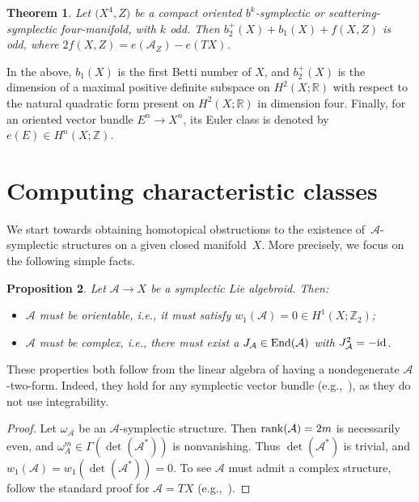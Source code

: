 \documentclass[10pt,a4paper]{amsart}
\numberwithin{equation}{section}
\newtheorem{Theorem}{Theorem}[section]
\newtheorem{Proposition}[Theorem]{Proposition}
 { \theoremstyle{definition}
\newtheorem{Definition}[Theorem]{Definition}
\newtheorem{Example}[Theorem]{Example}
\newtheorem{Remark}[Theorem]{Remark} }
\begin{document}
\begin{Theorem}\label{thm:intrologsymp} Let $\big(X^4,Z\big)$ be a compact oriented $b^k$-symplectic or scattering-symplectic four-manifold, with $k$ odd. Then $b_2^+(X) + b_1(X) + f(X,Z)$ is odd, where $2 f(X,Z) = e(\mathcal{A}_Z) - e(TX)$.
\end{Theorem}

In the above, $b_1(X)$ is the first Betti number of $X$, and $b_2^+(X)$ is the dimension of a maximal positive definite subspace on $H^2(X;\mathbb{R})$ with respect to the natural quadratic form present on $H^2(X;\mathbb{R})$ in dimension four. Finally, for an oriented vector bundle $E^n \to X^n$, its Euler class is denoted by $e(E) \in H^n(X;\mathbb{Z})$.

\section{Computing characteristic classes}\label{sec:homotopical}

We start towards obtaining homotopical obstructions to the existence of~$\mathcal{A}$-symplectic structures on a given closed manifold~$X$. More precisely, we focus on the following simple facts.

\begin{Proposition}\label{prop:symplaconsequences} Let $\mathcal{A} \to X$ be a symplectic Lie algebroid. Then:
	\begin{itemize}\itemsep=0pt
	\item $\mathcal{A}$ must be orientable, i.e., it must satisfy $w_1(\mathcal{A}) = 0 \in H^1(X;\mathbb{Z}_2)$;
	\item $\mathcal{A}$ must be complex, i.e., there must exist a $J_\mathcal{A} \in {\rm End}(\mathcal{A})$ with $J_\mathcal{A}^2 = - {\rm id}$.
	\end{itemize}
\end{Proposition}

These properties both follow from the linear algebra of having a nondegenerate $\mathcal{A}$-two-form. Indeed, they hold for any symplectic vector bundle (e.g.,~\cite{McDuffSalamon17}), as they do not use integrability.

\begin{proof} Let $\omega_\mathcal{A}$ be an $\mathcal{A}$-symplectic structure. Then ${\rm rank}(\mathcal{A}) = 2m$ is necessarily even, and $\omega_{A}^m \in \Gamma(\det(\mathcal{A}^*))$ is nonvanishing. Thus $\det(\mathcal{A}^*)$ is trivial, and $w_1(\mathcal{A}) = w_1(\det(\mathcal{A}^*)) = 0$. To see $\mathcal{A}$ must admit a complex structure, follow the standard proof for $\mathcal{A} = TX$ (e.g.,~\cite{McDuffSalamon17}).
\end{proof}
\end{document}
